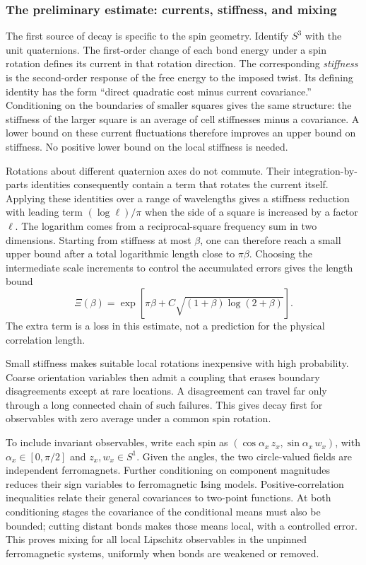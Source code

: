 \subsubsection{The preliminary estimate: currents, stiffness, and mixing}

The first source of decay is specific to the spin geometry. Identify
$S^3$ with the unit quaternions. The first-order change of each bond
energy under a spin rotation defines its current in that rotation
direction. The corresponding \emph{stiffness}
is the second-order response of the free energy to the imposed twist.
Its defining identity has the form ``direct quadratic cost minus
current covariance.'' Conditioning on the boundaries of smaller
squares gives the same structure: the stiffness of the larger square
is an average of cell stiffnesses minus a covariance. A lower bound
on these current fluctuations therefore improves an upper bound on
stiffness. No positive lower bound on the local stiffness is needed.

Rotations about different quaternion axes do not commute. Their
integration-by-parts identities consequently contain a term that
rotates the current itself. Applying these identities over a range of
wavelengths gives a stiffness reduction with leading term
$(\log \ell)/\pi$ when the side of a square is increased by a factor
$\ell$. The logarithm comes from a reciprocal-square frequency sum in
two dimensions. Starting from stiffness at most $\beta$, one can
therefore reach a small upper bound after a total logarithmic length
close to $\pi\beta$. Choosing the intermediate scale increments to
control the accumulated errors gives the length bound
\begin{equation}
 \Xi(\beta)=\exp\!\left[\pi\beta+
 C\sqrt{(1+\beta)\log(2+\beta)}\right].
 \label{intro:Xi}
\end{equation}
The extra term is a loss in this estimate, not a prediction for the
physical correlation length.

Small stiffness makes suitable local rotations inexpensive with high
probability. Coarse orientation variables then admit a coupling that
erases boundary disagreements except at rare locations. A disagreement
can travel far only through a long connected chain of such failures.
This gives decay first for observables with zero average under a common
spin rotation.

To include invariant observables, write each spin as
$(\cos\alpha_x\,z_x,\sin\alpha_x\,w_x)$, with
$\alpha_x\in[0,\pi/2]$ and $z_x,w_x\in S^1$. Given the angles, the
two circle-valued fields are independent ferromagnets. Further
conditioning on component magnitudes reduces their sign variables to
ferromagnetic Ising models. Positive-correlation inequalities relate
their general covariances to two-point functions. At both conditioning
stages the covariance of the conditional means must also be bounded;
cutting distant bonds makes those means local, with a controlled error.
This proves mixing for all local Lipschitz observables in the unpinned
ferromagnetic systems, uniformly when bonds are weakened or removed.

